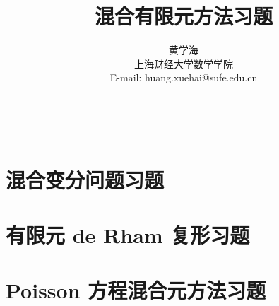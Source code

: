 \documentclass[11pt]{book}
\begin{document}
\newenvironment{zenumerate}{\newcounter{zitem}\setcounter{zitem}{0}}{}
\newcommand\zitem{\refstepcounter{zitem}(\thezitem) }

\newenvironment{xenumerate}[1][]
{\enumerate[(1)]}{\endenumerate}




\title{混合有限元方法习题}
\author{黄学海  \\{\small 上海财经大学数学学院}
\\{\small E-mail: huang.xuehai@sufe.edu.cn }
\\
\\
\\
\\
 }

\date{}
\vskip 0.5cm
\maketitle


\cleardoublepage
\renewcommand\contentsname{目录}
\tableofcontents







% 


\chapter{混合变分问题习题}

\cleardoublepage


\chapter{有限元 de Rham 复形习题}

\cleardoublepage

\chapter{Poisson 方程混合元方法习题}

\cleardoublepage


% 





{}


\cleardoublepage
\end{document}
